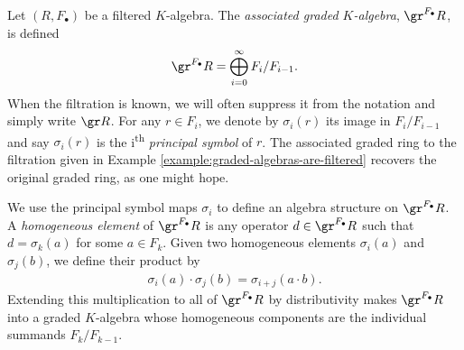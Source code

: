 \begin{defn}\label{defn:assoc-graded}
	Let $(R, F_\bullet)$ be a filtered $K$-algebra. The \emph{associated graded $K$-algebra}, $\gr^{F_\bullet} R$, is defined
	\begin{align*}
		\gr^{F_\bullet} R = \bigoplus^{\infty}_{i=0} F_i/F_{i-1}.
	\end{align*}
	When the filtration is known, we will often suppress it from the notation and simply write $\gr R$. For any $r \in F_i$, we denote by $\sigma_i(r)$ its image in $F_i/F_{i-1}$ and say $\sigma_i(r)$ is the i\textsuperscript{th} \emph{principal symbol} of $r$. The associated graded ring to the filtration given in Example \ref{example:graded-algebras-are-filtered} recovers the original graded ring, as one might hope.
\end{defn}
We use the principal symbol maps $\sigma_i$ to define an algebra structure on $\gr^{F_\bullet} R$. A \emph{homogeneous element} of $\gr^{F_\bullet}R$ is any operator $d \in \gr^{F_\bullet} R$ such that $d = \sigma_k(a)$ for some $a \in F_k$. Given two homogeneous elements $\sigma_i(a)$ and $\sigma_j(b)$, we define their product by
\begin{align*}
	\sigma_i(a)\cdot \sigma_j(b) = \sigma_{i+j}(a\cdot b).
\end{align*}
Extending this multiplication to all of $\gr^{F_\bullet} R$ by distributivity makes $\gr^{F_\bullet} R$ into a graded $K$-algebra whose homogeneous components are the individual summands $F_k/F_{k-1}$.

\begin{comment}
\begin{rmk}\label{rmk:two-filtrations-yield-same-assoc-graded}
	Given that the notation $\gr A$ makes no reference to the choice of filtration, one would hope that $\gr A$ is independent of the specific filtration chosen, and indeed it is. 
\end{rmk}
\end{comment}

